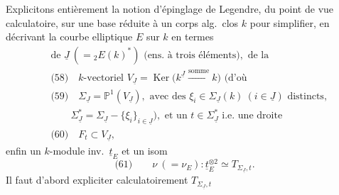 \documentclass[11pt,a4paper]{article}
\begin{document}

Explicitons entièrement la notion d'épinglage de Legendre, du point de vue
calculatoire, sur une base réduite à un corps alg.\ clos $k$ pour simplifier,
en décrivant la courbe elliptique $E$ sur $k$ en termes
\[
  \begin{aligned}
    &\text{de } \underline{J} \ (= {}_2E(k)^{*}) \text{ (ens.\ à trois éléments)}, \text{ de la}\\
    &\text{(58)} \quad k\text{-vectoriel } V_{\underline{J}} = \operatorname{Ker}\bigl(k^{\underline{J}} \xrightarrow{\text{somme}} k\bigr) \text{ (d'où} \\
    &\text{(59)} \quad \Sigma_{\underline{J}} = \mathbb{P}^1(V_{\underline{J}}), \text{ avec des } \xi_i \in \Sigma_{\underline{J}}(k) \ (i \in \underline{J}) \text{ distincts,}\\
    &\qquad \Sigma_{\underline{J}}^{*} = \Sigma_{\underline{J}} - \{\xi_i\}_{i \in \underline{J}}\text{)}, \text{ et un } t \in \Sigma_{\underline{J}}^{*} \text{ i.e.\ une droite}\\
    &\text{(60)} \quad F_t \subset V_{\underline{J}},
  \end{aligned}
\]
enfin un $k$-module inv.\ $\underline{t}_E$  et un
isom
\[
  \text{(61)} \qquad \nu \ (= \nu_E) : \underline{t}_E^{\otimes 2} \simeq T_{\Sigma_{\underline{J}},t} .
\]
Il faut d'abord expliciter calculatoirement $T_{\Sigma_{\underline{J}},t}$
\end{document}
